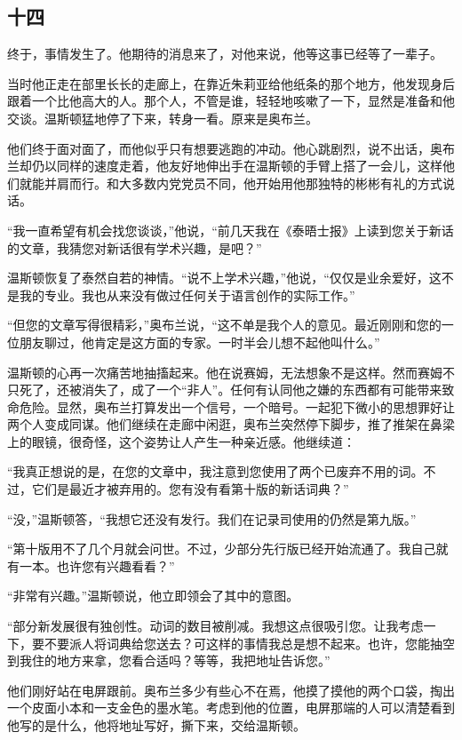 \subsection{十四}\label{ux5341ux56db}

终于，事情发生了。他期待的消息来了，对他来说，他等这事已经等了一辈子。

当时他正走在部里长长的走廊上，在靠近朱莉亚给他纸条的那个地方，他发现身后跟着一个比他高大的人。那个人，不管是谁，轻轻地咳嗽了一下，显然是准备和他交谈。温斯顿猛地停了下来，转身一看。原来是奥布兰。

他们终于面对面了，而他似乎只有想要逃跑的冲动。他心跳剧烈，说不出话，奥布兰却仍以同样的速度走着，他友好地伸出手在温斯顿的手臂上搭了一会儿，这样他们就能并肩而行。和大多数内党党员不同，他开始用他那独特的彬彬有礼的方式说话。

``我一直希望有机会找您谈谈，''他说，``前几天我在《泰晤士报》上读到您关于新话的文章，我猜您对新话很有学术兴趣，是吧？''

温斯顿恢复了泰然自若的神情。``说不上学术兴趣，''他说，``仅仅是业余爱好，这不是我的专业。我也从来没有做过任何关于语言创作的实际工作。''

``但您的文章写得很精彩，''奥布兰说，``这不单是我个人的意见。最近刚刚和您的一位朋友聊过，他肯定是这方面的专家。一时半会儿想不起他叫什么。''

温斯顿的心再一次痛苦地抽搐起来。他在说赛姆，无法想象不是这样。然而赛姆不只死了，还被消失了，成了一个``非人''。任何有认同他之嫌的东西都有可能带来致命危险。显然，奥布兰打算发出一个信号，一个暗号。一起犯下微小的思想罪好让两个人变成同谋。他们继续在走廊中闲逛，奥布兰突然停下脚步，推了推架在鼻梁上的眼镜，很奇怪，这个姿势让人产生一种亲近感。他继续道：

``我真正想说的是，在您的文章中，我注意到您使用了两个已废弃不用的词。不过，它们是最近才被弃用的。您有没有看第十版的新话词典？''

``没，''温斯顿答，``我想它还没有发行。我们在记录司使用的仍然是第九版。''

``第十版用不了几个月就会问世。不过，少部分先行版已经开始流通了。我自己就有一本。也许您有兴趣看看？''

``非常有兴趣。''温斯顿说，他立即领会了其中的意图。

``部分新发展很有独创性。动词的数目被削减。我想这点很吸引您。让我考虑一下，要不要派人将词典给您送去？可这样的事情我总是想不起来。也许，您能抽空到我住的地方来拿，您看合适吗？等等，我把地址告诉您。''

他们刚好站在电屏跟前。奥布兰多少有些心不在焉，他摸了摸他的两个口袋，掏出一个皮面小本和一支金色的墨水笔。考虑到他的位置，电屏那端的人可以清楚看到他写的是什么，他将地址写好，撕下来，交给温斯顿。

